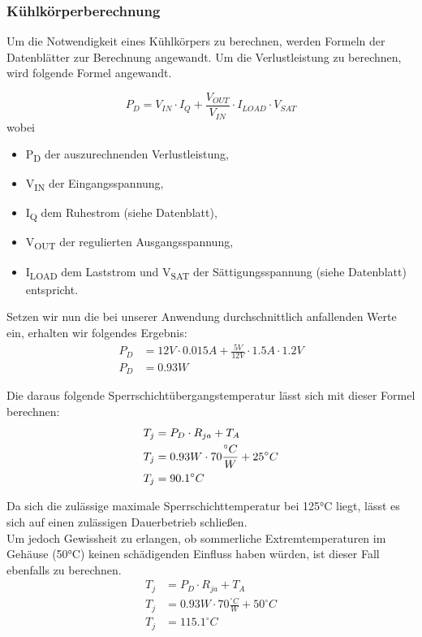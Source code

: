 \subsubsection{Kühlkörperberechnung}

Um die Notwendigkeit eines Kühlkörpers zu berechnen, werden Formeln der Datenblätter zur Berechnung angewandt.
Um die Verlustleistung zu berechnen, wird folgende Formel angewandt.

\begin{equation}
    P_D = V_{IN} \cdot I_Q + \frac{V_{OUT}}{V_{IN}} \cdot I_{LOAD} \cdot V_{SAT}
\end{equation}
wobei
\begin{itemize}
    \item P\textsubscript{D} der auszurechnenden Verlustleistung,
    \item V\textsubscript{IN} der Eingangsspannung,
    \item I\textsubscript{Q} dem Ruhestrom (siehe Datenblatt),
    \item V\textsubscript{OUT} der regulierten Ausgangsspannung,
    \item I\textsubscript{LOAD} dem Laststrom und V\textsubscript{SAT} der Sättigungsspannung (siehe Datenblatt) entspricht.
\end{itemize}

Setzen wir nun die bei unserer Anwendung durchschnittlich anfallenden Werte ein, erhalten wir folgendes Ergebnis:
\begin{align*}
    P_D &= 12V \cdot 0.015A + \frac{5V}{12V} \cdot 1.5A \cdot 1.2V \\
    P_D &= 0.93W
\end{align*}

Die daraus folgende Sperrschichtübergangstemperatur lässt sich mit dieser Formel berechnen:
\begin{align}
    T_j &= P_D \cdot R_{ja} + T_A\\
    T_j &= 0.93W \cdot 70\frac{{}^{\circ}C}{W} + 25^{\circ}C \notag \\
    T_j &= 90.1^{\circ}C \notag
\end{align}

Da sich die zulässige maximale Sperrschichttemperatur bei 125°C liegt, lässt es sich auf einen zulässigen Dauerbetrieb schließen.\\
Um jedoch Gewissheit zu erlangen, ob sommerliche Extremtemperaturen im Gehäuse (50°C) keinen schädigenden Einfluss haben würden, ist dieser Fall ebenfalls zu berechnen.
\begin{align*}
    T_j &= P_D \cdot R_{ja} + T_A\\
    T_j &= 0.93W \cdot 70\frac{{}^{\circ}C}{W} + 50^{\circ}C \\
    T_j &= 115.1^{\circ}C
\end{align*}

